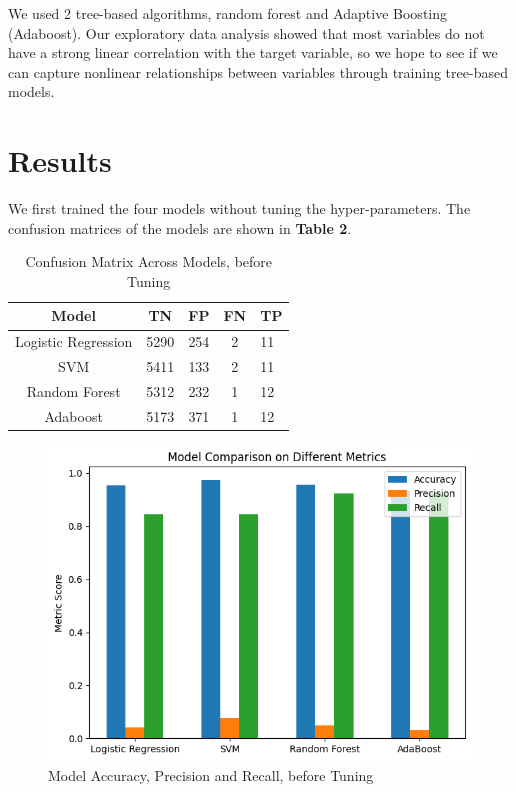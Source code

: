 \documentclass[sigconf, nonacm]{acmart}
\begin{document}
We used 2 tree-based algorithms, random forest and Adaptive Boosting (Adaboost). Our exploratory data analysis showed that most variables do not have a strong linear correlation with the target variable, so we hope to see if we can capture nonlinear relationships between variables through training tree-based models. 

\section{Results}

We first trained the four models without tuning the hyper-parameters. The confusion matrices of the models are shown in {\bfseries Table 2}. 

\begin{table}
  \caption{Confusion Matrix Across Models, before Tuning}
  \label{tab:tn:fp:fn:tp}
  \begin{tabular}{ccccl}
    \toprule
        Model&TN&FP&FN&TP\\
    \midrule
        Logistic Regression& 5290& 254& 2&11\\
        SVM& 5411& 133& 2&11\\
        Random Forest& 5312& 232& 1&12\\
        Adaboost&5173& 371& 1&12\\
    \bottomrule
\end{tabular}
\end{table}

\begin{figure}[h]
  \centering
  \includegraphics[width=\linewidth]{matrix comparison.png}
  \caption{Model Accuracy, Precision and Recall, before Tuning}
\end{figure}
\end{document}
